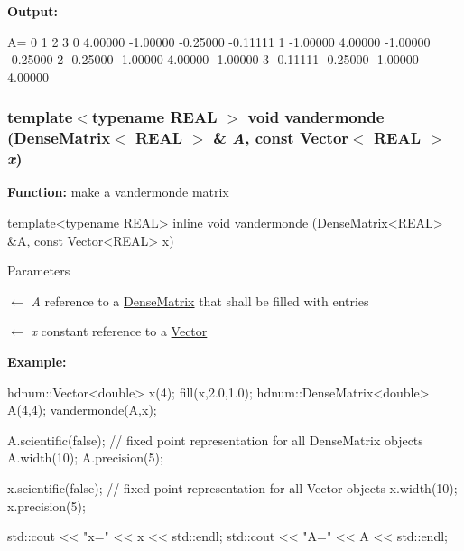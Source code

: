 {\bfseries Output:} \begin{DoxyVerb}
A=
                      0          1          2          3 
          0     4.00000   -1.00000   -0.25000   -0.11111 
          1    -1.00000    4.00000   -1.00000   -0.25000 
          2    -0.25000   -1.00000    4.00000   -1.00000 
          3    -0.11111   -0.25000   -1.00000    4.00000 
	\end{DoxyVerb}
 \hypertarget{classhdnum_1_1DenseMatrix_a1ed8c7d92b4b38e3e48eaf3a8cce1d27}{
\subsubsection[{vandermonde}]{\setlength{\rightskip}{0pt plus 5cm}template$<$typename REAL $>$ void vandermonde ({\bf DenseMatrix}$<$ REAL $>$ \& {\em A}, \/  const {\bf Vector}$<$ REAL $>$ {\em x})}}
\label{classhdnum_1_1DenseMatrix_a1ed8c7d92b4b38e3e48eaf3a8cce1d27}
\par
 {\bfseries Function:} make a vandermonde matrix 
\begin{DoxyCode}
  template<typename REAL>
  inline void vandermonde (DenseMatrix<REAL> &A, const Vector<REAL> x)
\end{DoxyCode}



\begin{DoxyParams}{Parameters}
\item[\mbox{$\leftarrow$} {\em A}]reference to a \hyperlink{classhdnum_1_1DenseMatrix}{DenseMatrix} that shall be filled with entries \item[\mbox{$\leftarrow$} {\em x}]constant reference to a \hyperlink{classhdnum_1_1Vector}{Vector}\end{DoxyParams}
{\bfseries Example:} 
\begin{DoxyCode}
  hdnum::Vector<double> x(4);
  fill(x,2.0,1.0);
  hdnum::DenseMatrix<double> A(4,4);
  vandermonde(A,x);

  A.scientific(false); // fixed point representation for all DenseMatrix objects
  A.width(10);
  A.precision(5);

  x.scientific(false); // fixed point representation for all Vector objects
  x.width(10);
  x.precision(5);

  std::cout << "x=" << x << std::endl;
  std::cout << "A=" << A << std::endl;
\end{DoxyCode}


